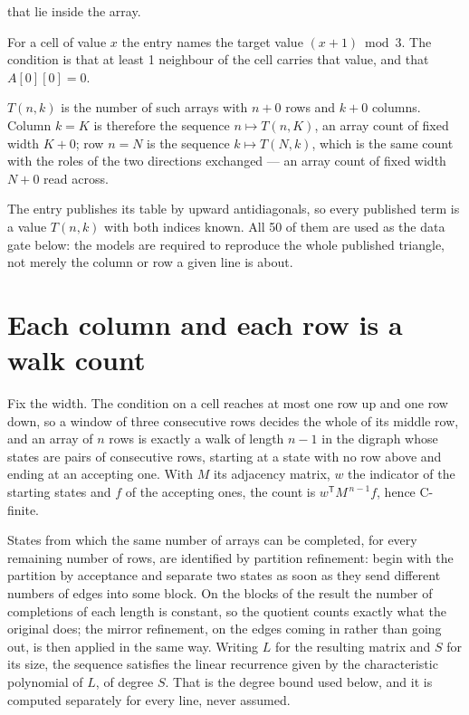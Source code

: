 \documentclass[11pt]{article}
\theoremstyle{definition}
\begin{document}
that lie inside the array.

For a cell of value $x$ the entry names the target value $(x + 1) \bmod 3$. The condition is that at least 1 neighbour of the cell carries that value, and that $A[0][0] = 0$.

$T(n,k)$ is the number of such arrays with $n + 0$ rows and $k + 0$ columns. Column $k = K$ is therefore the sequence $n \mapsto T(n,K)$, an array count of fixed width $K + 0$; row $n = N$ is the sequence $k \mapsto T(N,k)$, which is the same count with the roles of the two directions exchanged --- an array count of fixed width $N + 0$ read across.

The entry publishes its table by upward antidiagonals, so every published term is a value $T(n,k)$ with both indices known. All 50 of them are used as the data gate below: the models are required to reproduce the whole published triangle, not merely the column or row a given line is about.

\section{Each column and each row is a walk count}

Fix the width. The condition on a cell reaches at most one row up and one row down, so a window of three consecutive rows decides the whole of its middle row, and an array of $n$ rows is exactly a walk of length $n-1$ in the digraph whose states are pairs of consecutive rows, starting at a state with no row above and ending at an accepting one. With $M$ its adjacency matrix, $w$ the indicator of the starting states and $f$ of the accepting ones, the count is $w^{\mathsf T}M^{\,n-1}f$, hence C-finite.

States from which the same number of arrays can be completed, for every remaining number of rows, are identified by partition refinement: begin with the partition by acceptance and separate two states as soon as they send different numbers of edges into some block. On the blocks of the result the number of completions of each length is constant, so the quotient counts exactly what the original does; the mirror refinement, on the edges coming in rather than going out, is then applied in the same way. Writing $L$ for the resulting matrix and $S$ for its size, the sequence satisfies the linear recurrence given by the characteristic polynomial of $L$, of degree $S$. That is the degree bound used below, and it is computed separately for every line, never assumed.
\end{document}

